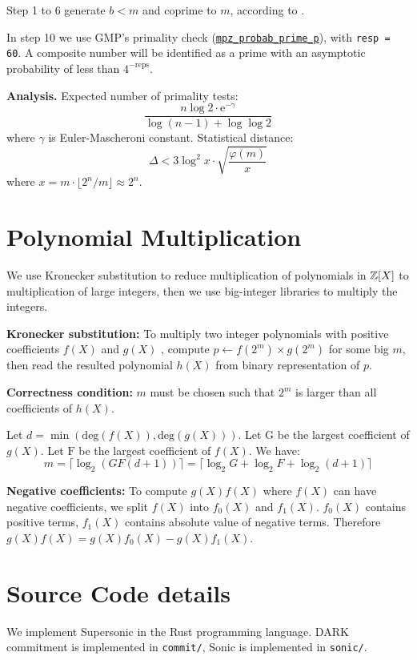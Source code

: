 Step 1 to 6 generate $b < m$ and coprime to $m$, according to \cite{joye2006fast}.

In step 10 we use GMP's primality check  (\href{https://gmplib.org/manual/Number-Theoretic-Functions}{\texttt{mpz\_probab\_prime\_p}}), with \texttt{resp = 60}.  A composite number will be identified as a prime with an asymptotic probability of less than $4^{-\mathrm{reps}}$.


\textbf{Analysis.} Expected number of primality tests:
$$\frac{n \log 2 \cdot \mathrm{e}^{-\gamma}}{\log(n-1) + \log \log 2}$$
where $\gamma$ is Euler-Mascheroni constant. Statistical distance:
$$\Delta < 3 \log^2 x \cdot \sqrt{\frac{\varphi(m)}{x}}$$
where $x = m \cdot \lfloor 2^n / m \rfloor \approx 2^n$.

\section{Polynomial Multiplication}

We use Kronecker substitution to reduce multiplication of polynomials in $\mathbb{Z}[X]$ to multiplication of large integers, then we use big-integer libraries to multiply the integers.

\textbf{Kronecker substitution:} To multiply two integer polynomials with positive coefficients $f(X)$ and $g(X)$ , compute $p \gets f(2^m) \times g(2^m)$ for some big $m$, then read the resulted polynomial $h(X)$ from binary representation of $p$.

\textbf{Correctness condition:} $m$ must be chosen such that $2^m$ is larger than all coefficients of $h(X)$.

Let $d =\min(\mathrm{deg}(f(X)), \mathrm{deg}(g(X)))$.
Let $\mathrm{G}$ be the largest coefficient of $g(X)$.
Let $\mathrm{F}$ be the largest coefficient of $f(X)$.
We have:
$$m = \lceil \log_2(GF(d+1)) \rceil = \lceil \log_2 G + \log_2 F + \log_2 (d+1) \rceil$$

\textbf{Negative coefficients:} To compute $g(X) f(X)$ where $f(X)$ can have negative coefficients, we split $f(X)$ into $f_0(X)$ and $f_1(X)$. $f_0(X)$ contains positive terms, $f_1(X)$ contains absolute value of negative terms. Therefore $g(X) f(X) = g(X) f_0(X) - g(X) f_1(X)$.

\section{Source Code details}

We implement Supersonic in the Rust programming language. DARK commitment is implemented in \texttt{commit/}, Sonic is implemented in \texttt{sonic/}.

